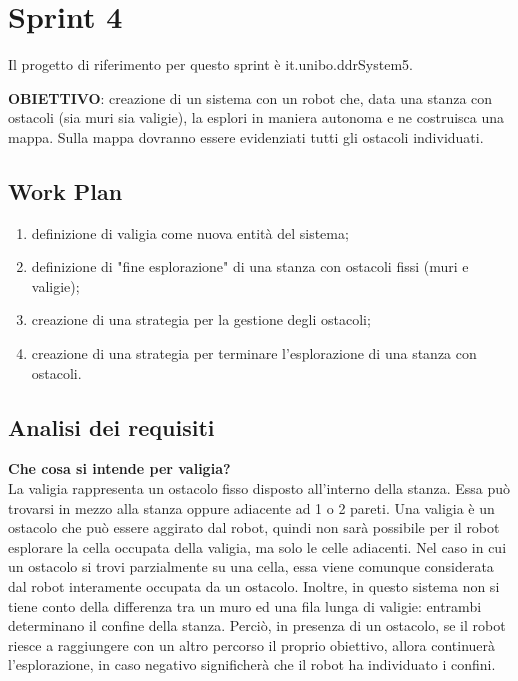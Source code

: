 \section{Sprint 4} 

Il progetto di riferimento per questo sprint è it.unibo.ddrSystem5.

\textbf{OBIETTIVO}: creazione di un sistema con un robot che, data una stanza con ostacoli (sia muri sia valigie), la esplori in maniera autonoma e ne costruisca una mappa. Sulla mappa dovranno essere evidenziati tutti gli ostacoli individuati. 

\subsection{Work Plan}
\begin{enumerate}
\item definizione di valigia come nuova entità del sistema;
\item definizione di "fine esplorazione" di una stanza con ostacoli fissi (muri e valigie);
\item creazione di una strategia per la gestione degli ostacoli;
\item creazione di una strategia per terminare l'esplorazione di una stanza con ostacoli.
\end{enumerate}

\subsection{Analisi dei requisiti}

\textbf{Che cosa si intende per valigia?}\\
La valigia rappresenta un ostacolo fisso disposto all'interno della stanza. Essa può trovarsi in mezzo alla stanza oppure adiacente ad 1 o 2 pareti. Una valigia è un ostacolo che può essere aggirato dal robot, quindi non sarà possibile per il robot esplorare la cella occupata della valigia, ma solo le celle adiacenti.
Nel caso in cui un ostacolo si trovi parzialmente su una cella, essa viene comunque considerata dal robot interamente occupata da un ostacolo.
Inoltre, in questo sistema non si tiene conto della differenza tra un muro ed una fila lunga di valigie: entrambi determinano il confine della stanza. Perciò, in presenza di un ostacolo, se il robot riesce a raggiungere con un altro percorso il proprio obiettivo, allora continuerà l'esplorazione, in caso negativo significherà che il robot ha individuato i confini.


